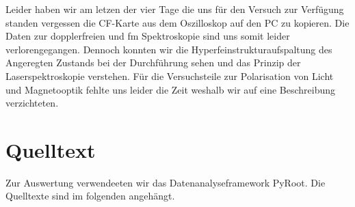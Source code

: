\documentclass[12pt]{article}
\begin{document}
Leider haben wir am letzen der vier Tage die uns für den Versuch zur Verfügung standen vergessen die CF-Karte aus dem Oszilloskop auf den PC zu kopieren. Die Daten zur dopplerfreien und fm Spektroskopie sind uns somit leider verlorengegangen. Dennoch konnten wir die Hyperfeinstrukturaufspaltung des Angeregten Zustands bei der Durchführung sehen und das Prinzip der Laserspektroskopie verstehen. Für die Versuchsteile zur Polarisation von Licht und Magnetooptik fehlte uns leider die Zeit weshalb wir auf eine Beschreibung verzichteten.
\section{Quelltext}
Zur Auswertung verwendeeten wir das Datenanalyseframework PyRoot. Die Quelltexte sind im folgenden angehängt.

%
\end{document}
